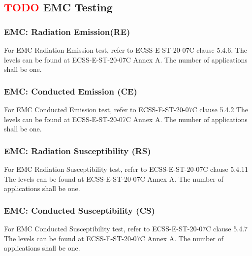\subsection{ \textcolor{red}{TODO} EMC Testing}


\subsubsection{EMC: Radiation Emission(RE)}
For EMC Radiation Emission test, refer to ECSS-E-ST-20-07C clause 5.4.6. The levels
can be found at ECSS-E-ST-20-07C Annex A. The number of applications shall be one.

\subsubsection{EMC: Conducted Emission (CE)}
For EMC Conducted Emission test, refer to ECSS-E-ST-20-07C clause 5.4.2 The levels
can be found at ECSS-E-ST-20-07C Annex A. The number of applications shall be one.

\subsubsection{EMC: Radiation Susceptibility (RS)}
For EMC Radiation Susceptibility test, refer to ECSS-E-ST-20-07C clause 5.4.11 The
levels can be found at ECSS-E-ST-20-07C Annex A. The number of applications shall be one.

\subsubsection{EMC: Conducted Susceptibility (CS)}
For EMC Conducted Susceptibility test, refer to ECSS-E-ST-20-07C clause 5.4.7 The
levels can be found at ECSS-E-ST-20-07C Annex A. The number of applications shall be one.





